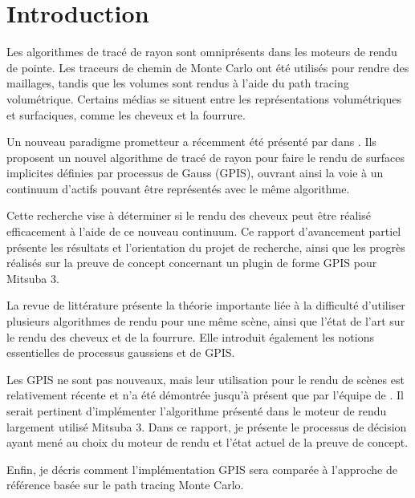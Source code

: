 \section{Introduction}
Les algorithmes de tracé de rayon sont omniprésents dans les moteurs de rendu de pointe. Les traceurs de chemin de Monte Carlo ont été utilisés pour rendre des maillages, tandis que les volumes sont rendus à l'aide du path tracing volumétrique. Certains médias se situent entre les représentations volumétriques et surfaciques, comme les cheveux et la fourrure.

Un nouveau paradigme prometteur a récemment été présenté par \citeauthor{seyb24from} dans  \cite{seyb24from}. Ils proposent un nouvel algorithme de tracé de rayon pour faire le rendu de surfaces implicites définies par processus de Gauss (GPIS), ouvrant ainsi la voie à un continuum d'actifs pouvant être représentés avec le même algorithme.

Cette recherche vise à déterminer si le rendu des cheveux peut être réalisé efficacement à l'aide de ce nouveau continuum. Ce rapport d'avancement partiel présente les résultats et l'orientation du projet de recherche, ainsi que les progrès réalisés sur la preuve de concept concernant un plugin de forme GPIS pour Mitsuba 3.

La revue de littérature présente la théorie importante liée à la difficulté d'utiliser plusieurs algorithmes de rendu pour une même scène, ainsi que l'état de l'art sur le rendu des cheveux et de la fourrure. Elle introduit également les notions essentielles de processus gaussiens et de GPIS.

Les GPIS ne sont pas nouveaux, mais leur utilisation pour le rendu de scènes est relativement récente et n'a été démontrée jusqu'à présent que par l'équipe de \textcite{seyb24from}. Il serait pertinent d'implémenter l'algorithme présenté dans le moteur de rendu largement utilisé Mitsuba 3. Dans ce rapport, je présente le processus de décision ayant mené au choix du moteur de rendu et l'état actuel de la preuve de concept.

Enfin, je décris comment l'implémentation GPIS sera comparée à l'approche de référence basée sur le path tracing Monte Carlo.
